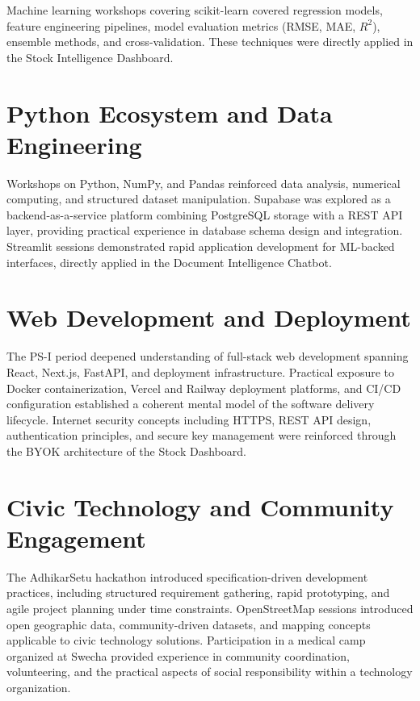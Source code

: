 \documentclass{book}
\begin{document}
\par\noindent Machine learning workshops covering scikit-learn covered regression models, feature engineering pipelines, model evaluation metrics (RMSE, MAE, $R^2$), ensemble methods, and cross-validation. These techniques were directly applied in the Stock Intelligence Dashboard.

\section{Python Ecosystem and Data Engineering}

\par\noindent Workshops on Python, NumPy, and Pandas reinforced data analysis, numerical computing, and structured dataset manipulation. Supabase was explored as a backend-as-a-service platform combining PostgreSQL storage with a REST API layer, providing practical experience in database schema design and integration. Streamlit sessions demonstrated rapid application development for ML-backed interfaces, directly applied in the Document Intelligence Chatbot.

\section{Web Development and Deployment}

\par\noindent The PS-I period deepened understanding of full-stack web development spanning React, Next.js, FastAPI, and deployment infrastructure. Practical exposure to Docker containerization, Vercel and Railway deployment platforms, and CI/CD configuration established a coherent mental model of the software delivery lifecycle. Internet security concepts including HTTPS, REST API design, authentication principles, and secure key management were reinforced through the BYOK architecture of the Stock Dashboard.

\section{Civic Technology and Community Engagement}

\par\noindent The AdhikarSetu hackathon introduced specification-driven development practices, including structured requirement gathering, rapid prototyping, and agile project planning under time constraints. OpenStreetMap sessions introduced open geographic data, community-driven datasets, and mapping concepts applicable to civic technology solutions. Participation in a medical camp organized at Swecha provided experience in community coordination, volunteering, and the practical aspects of social responsibility within a technology organization.
\end{document}
